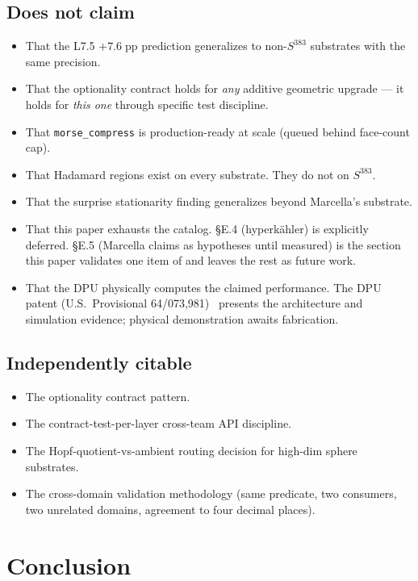 \documentclass[11pt,letterpaper]{article}
\begin{document}
\subsection{Does not claim}
\begin{itemize}[nosep]
\item That the L7.5 $+7.6\;\text{pp}$ prediction generalizes to
  non-$S^{383}$ substrates with the same precision.
\item That the optionality contract holds for \emph{any} additive
  geometric upgrade --- it holds for \emph{this one} through specific
  test discipline.
\item That \texttt{morse\_compress} is production-ready at scale
  (queued behind face-count cap).
\item That Hadamard regions exist on every substrate. They do not on
  $S^{383}$.
\item That the surprise stationarity finding generalizes beyond
  Marcella's substrate.
\item That this paper exhausts the catalog. \S E.4 (hyperk\"ahler)
  is explicitly deferred. \S E.5 (Marcella claims as hypotheses
  until measured) is the section this paper validates one item of
  and leaves the rest as future work.
\item That the DPU physically computes the claimed performance. The
  DPU patent (U.S.\ Provisional 64/073,981)~\cite{davis2026dpu}
  presents the architecture and simulation evidence; physical
  demonstration awaits fabrication.
\end{itemize}

\subsection{Independently citable}
\begin{itemize}[nosep]
\item The optionality contract pattern.
\item The contract-test-per-layer cross-team API discipline.
\item The Hopf-quotient-vs-ambient routing decision for high-dim
  sphere substrates.
\item The cross-domain validation methodology (same predicate, two
  consumers, two unrelated domains, agreement to four decimal
  places).
\end{itemize}


\section{Conclusion}
\label{sec:conclusion}
\end{document}
